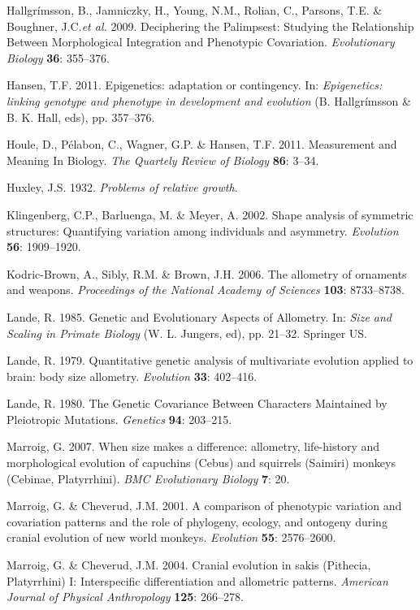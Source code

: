 \documentclass[12pt,]{article}
\begin{document}
Hallgrímsson, B., Jamniczky, H., Young, N.M., Rolian, C., Parsons, T.E.
\& Boughner, J.C.\emph{et al.} 2009. Deciphering the Palimpsest:
Studying the Relationship Between Morphological Integration and
Phenotypic Covariation. \emph{Evolutionary Biology} \textbf{36}:
355--376.

Hansen, T.F. 2011. Epigenetics: adaptation or contingency. In:
\emph{Epigenetics: linking genotype and phenotype in development and
evolution} (B. Hallgrímsson \& B. K. Hall, eds), pp. 357--376.

Houle, D., Pélabon, C., Wagner, G.P. \& Hansen, T.F. 2011. Measurement
and Meaning In Biology. \emph{The Quartely Review of Biology}
\textbf{86}: 3--34.

Huxley, J.S. 1932. \emph{Problems of relative growth}.

Klingenberg, C.P., Barluenga, M. \& Meyer, A. 2002. Shape analysis of
symmetric structures: Quantifying variation among individuals and
asymmetry. \emph{Evolution} \textbf{56}: 1909--1920.

Kodric-Brown, A., Sibly, R.M. \& Brown, J.H. 2006. The allometry of
ornaments and weapons. \emph{Proceedings of the National Academy of
Sciences} \textbf{103}: 8733--8738.

Lande, R. 1985. Genetic and Evolutionary Aspects of Allometry. In:
\emph{Size and Scaling in Primate Biology} (W. L. Jungers, ed), pp.
21--32. Springer US.

Lande, R. 1979. Quantitative genetic analysis of multivariate evolution
applied to brain: body size allometry. \emph{Evolution} \textbf{33}:
402--416.

Lande, R. 1980. The Genetic Covariance Between Characters Maintained by
Pleiotropic Mutations. \emph{Genetics} \textbf{94}: 203--215.

Marroig, G. 2007. When size makes a difference: allometry, life-history
and morphological evolution of capuchins (Cebus) and squirrels (Saimiri)
monkeys (Cebinae, Platyrrhini). \emph{BMC Evolutionary Biology}
\textbf{7}: 20.

Marroig, G. \& Cheverud, J.M. 2001. A comparison of phenotypic variation
and covariation patterns and the role of phylogeny, ecology, and
ontogeny during cranial evolution of new world monkeys. \emph{Evolution}
\textbf{55}: 2576--2600.

Marroig, G. \& Cheverud, J.M. 2004. Cranial evolution in sakis
(Pithecia, Platyrrhini) I: Interspecific differentiation and allometric
patterns. \emph{American Journal of Physical Anthropology} \textbf{125}:
266--278.
\end{document}
